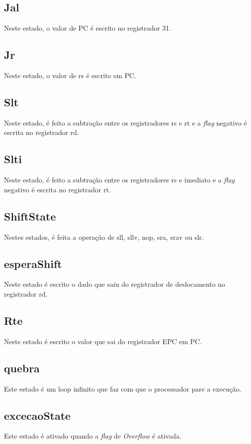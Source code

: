 \documentclass{article}
\begin{document}
    \subsection{Jal}
    Neste estado, o valor de PC é escrito no registrador 31.
    
    \subsection{Jr}
    Neste estado, o valor de rs é escrito em PC.
    
    \subsection{Slt}
    Neste estado, é feito a subtração entre os registradores rs e rt e a {\it flag} negativo é escrita no registrador rd.
    
    \subsection{Slti}
    Neste estado, é feito a subtração entre os registradores rs e imediato e a {\it flag} negativo é escrita no registrador rt.
    
    \subsection{ShiftState}
    Nestes estados, é feita a operação de sll, sllv, nop, sra, srav ou slr.
    
    \subsection{esperaShift}
    Neste estado é escrito o dado que saiu do registrador de deslocamento no registrador rd.
    
    \subsection{Rte}
    Neste estado é escrito o valor que sai do registrador EPC em PC.
    
    \subsection{quebra}
    Este estado é um loop infinito que faz com que o processador pare a execução.
    
    \subsection{excecaoState}
    Este estado é ativado quando a {\it flag} de {\it Overflow} é ativada.
    
\end{document}
